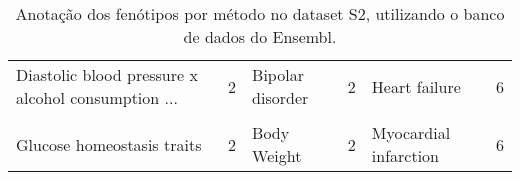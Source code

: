 \begin{table}[!htbp]
{\begin{tabular}[t]{lrlrlr}
Diastolic blood pressure x alcohol consumption ... & 2 & Bipolar disorder & 2 & Heart failure & 6\\
\cellcolor{gray!6}{Drinking behavior} & \cellcolor{gray!6}{2} & \cellcolor{gray!6}{Blood Cells} & \cellcolor{gray!6}{2} & \cellcolor{gray!6}{Intraocular pressure} & \cellcolor{gray!6}{6}\\
Glucose homeostasis traits & 2 & Body Weight & 2 & Myocardial infarction & 6\\
\bottomrule
\end{tabular}}

\caption{Anotação dos fenótipos por método no dataset S2, utilizando o banco de dados do Ensembl.}
\label{tab:ds2_ensembl_persnp_annot}

\end{table}
